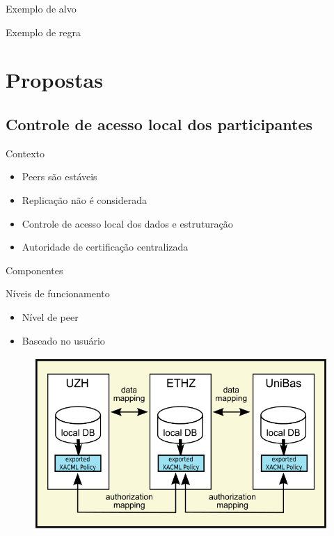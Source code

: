 \documentclass{beamer}
\begin{document}
\begin{frame}[plain]{Exemplo de alvo}
 
\end{frame}

\begin{frame}[plain]{Exemplo de regra}
 
\end{frame}


\section{Propostas}

\subsection{Controle de acesso local dos participantes} %

\begin{frame}{Contexto}
  \begin{itemize}
   \item Peers são estáveis
   \item Replicação não é considerada
   \item Controle de acesso local dos dados e estruturação
   \item Autoridade de certificação centralizada
  \end{itemize}

\end{frame}


\begin{frame}{Componentes}
 \begin{block}{Níveis de funcionamento}
  \begin{itemize}
   \item Nível de peer
   \item Baseado no usuário
  \end{itemize}
 \end{block}
 \begin{figure}[H]
    \includegraphics[scale=0.3]{demap_fig1.png}
 \end{figure}

\end{frame}
\end{document}
